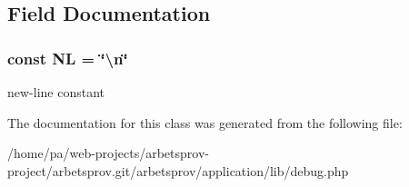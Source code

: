 \subsection{Field Documentation}
\hypertarget{classdebug_a3948c042f5024ab0264a5413294eff6a}{
\subsubsection[{N\-L}]{\setlength{\rightskip}{0pt plus 5cm}const N\-L = \char`\"{}\textbackslash{}n\char`\"{}}}\label{classdebug_a3948c042f5024ab0264a5413294eff6a}
new-\/line constant 

The documentation for this class was generated from the following file\-:\begin{DoxyCompactItemize}
\item 
/home/pa/web-\/projects/arbetsprov-\/project/arbetsprov.\-git/arbetsprov/application/lib/debug.\-php\end{DoxyCompactItemize}
